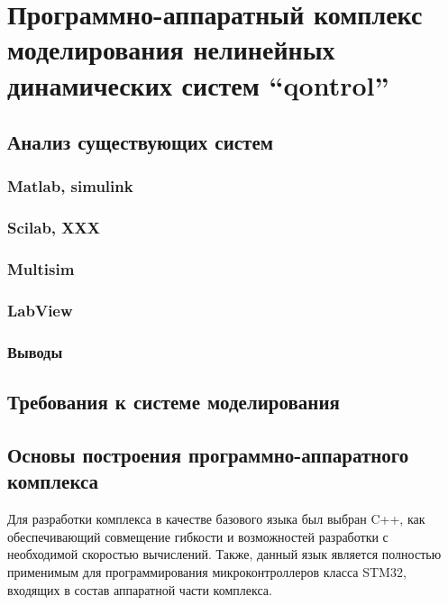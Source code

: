 \chapter{Программно-аппаратный комплекс моделирования нелинейных динамических систем ``qontrol''}
\label{chapter_qontrol}

\section{Анализ существующих систем} %

\subsection{Matlab, simulink}

\subsection{Scilab, XXX}

\subsection{Multisim}

\subsection{LabView}

\subsection{Выводы}



\section{Требования к системе моделирования} %

\section{Основы построения программно-аппаратного комплекса} %

Для разработки комплекса в качестве базового языка был выбран C++,
как обеспечивающий совмещение гибкости и возможностей разработки
с необходимой скоростью вычислений. Также, данный язык
является полностью применимым для программирования микроконтроллеров
класса STM32, входящих в состав аппаратной части комплекса.

